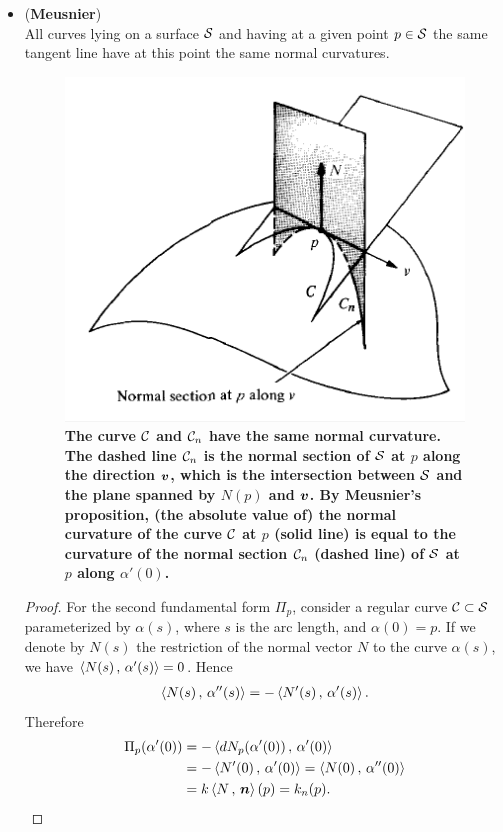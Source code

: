 \documentclass[11pt]{article}
\begin{document}
\begin{itemize}
\item \begin{theorem}(\textbf{Meusnier}) \label{th: meusnier}\\
All curves lying on a surface ${\mathcal S}$ and having at a given point $p\in {\mathcal S}$ the same tangent line have at this point the same normal curvatures. 
\end{theorem}
\begin{figure}[thb]
\centering
\begin{minipage}{0.6\linewidth}
 \centerline{\includegraphics[scale = 0.43]{meusnier.png}}
\end{minipage}
\caption{\scriptsize
\textbf{The curve ${\mathcal C}$ and ${\mathcal C}_{n}$ have the same normal curvature. The dashed line ${\mathcal C}_{n}$ is the normal section of ${\mathcal S}$ at $p$ along the direction $\boldsymbol{v}$, which is the intersection between ${\mathcal S}$ and the plane spanned by $N(p)$ and $\boldsymbol{v}$. By Meusnier's proposition, (the absolute value of) the normal curvature of the curve ${\mathcal C}$ at $p$ (solid line) is equal to the  curvature of the normal section ${\mathcal C}_{n}$ (dashed line) of ${\mathcal S}$ at $p$ along $\alpha'(0)$. }}
\end{figure}
\begin{proof}
For the second fundamental form $\Pi_{p}$, consider a regular curve ${\mathcal C} \subset {\mathcal S}$ parameterized by $\alpha(s)$, where $s$ is the arc length, and $\alpha(0) = p$. If we denote by $N(s)$ the restriction of the normal vector $N$ to the curve $\alpha(s)$, we have $\left\langle N(s)\,,\, \alpha'(s) \right\rangle = 0$. Hence 
\begin{align*}
\left\langle N(s)\,,\, \alpha''(s) \right\rangle = - \left\langle N'(s)\,,\, \alpha'(s) \right\rangle.
\end{align*}
Therefore
\begin{align*}
\Pi_{p}(\alpha'(0)) &= -\left\langle dN_{p}(\alpha'(0))\,,\, \alpha'(0) \right\rangle\\
&= -\left\langle N'(0)\,,\, \alpha'(0) \right\rangle = \left\langle N(0)\,,\, \alpha''(0) \right\rangle\\
&= k\left\langle N\,,\, \boldsymbol{n} \right\rangle(p) = k_{n}(p). 
\end{align*}


\end{proof}
\end{itemize}
\end{document}
